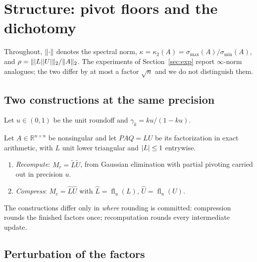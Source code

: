 %

\section{Structure: pivot floors and the dichotomy}\label{sec:structure}

Throughout, $\lVert \cdot \rVert$ denotes the spectral norm,
$\kappa=\kappa_2(A)=\sigma_{\max}(A)/\sigma_{\min}(A)$, and
$\rho=\lVert \lvert L \rvert\lvert U \rvert \rVert_2/\lVert A \rVert_2$.  The experiments of
Section~\ref{sec:exp} report $\infty$-norm analogues; the two differ by at most a
factor $\sqrt n$ and we do not distinguish them.

\subsection{Two constructions at the same precision}

Let $u\in(0,1)$ be the unit roundoff and $\gamma_k=ku/(1-ku)$.

\begin{definition}\label{def:constructions}
Let $A\in\mathbb{R}^{n\times n}$ be nonsingular and let $PAQ=LU$ be its
factorization in exact arithmetic, with $L$ unit lower triangular and
$\lvert L \rvert\le1$ entrywise.
\begin{enumerate}
  \item \emph{Recompute}: $M_r=\tilde L\tilde U$, from Gaussian elimination with
        partial pivoting carried out in precision $u$.
  \item \emph{Compress}: $M_c=\hat L\hat U$ with
        $\hat L=\operatorname{fl}_u(L)$, $\hat U=\operatorname{fl}_u(U)$.
\end{enumerate}
\end{definition}

The constructions differ only in \emph{where} rounding is committed: compression
rounds the finished factors once; recomputation rounds every intermediate update.

\subsection{Perturbation of the factors}

